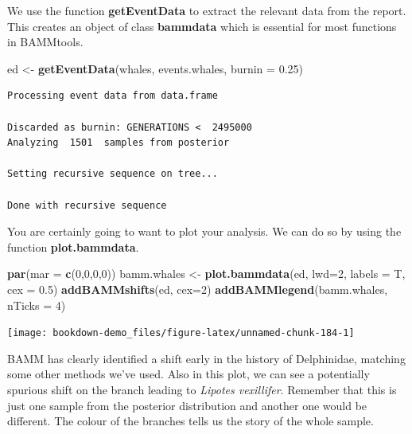 \documentclass[
]{book}
\newenvironment{Shaded}{\begin{snugshade}}{\end{snugshade}}
\newcommand{\DataTypeTok}[1]{\textcolor[rgb]{0.13,0.29,0.53}{#1}}
\newcommand{\DecValTok}[1]{\textcolor[rgb]{0.00,0.00,0.81}{#1}}
\newcommand{\FloatTok}[1]{\textcolor[rgb]{0.00,0.00,0.81}{#1}}
\newcommand{\KeywordTok}[1]{\textcolor[rgb]{0.13,0.29,0.53}{\textbf{#1}}}
\newcommand{\NormalTok}[1]{#1}
\newcommand{\StringTok}[1]{\textcolor[rgb]{0.31,0.60,0.02}{#1}}
\begin{document}
We use the function \textbf{getEventData} to extract the relevant data from the report. This creates an object of class \textbf{bammdata} which is essential for most functions in BAMMtools.

\begin{Shaded}
\begin{Highlighting}[]
\NormalTok{ed \textless{}{-}}\StringTok{ }\KeywordTok{getEventData}\NormalTok{(whales, events.whales, }\DataTypeTok{burnin =} \FloatTok{0.25}\NormalTok{)}
\end{Highlighting}
\end{Shaded}

\begin{verbatim}
Processing event data from data.frame

Discarded as burnin: GENERATIONS <  2495000
Analyzing  1501  samples from posterior

Setting recursive sequence on tree...

Done with recursive sequence
\end{verbatim}

You are certainly going to want to plot your analysis. We can do so by using the function \textbf{plot.bammdata}.

\begin{Shaded}
\begin{Highlighting}[]
\KeywordTok{par}\NormalTok{(}\DataTypeTok{mar =} \KeywordTok{c}\NormalTok{(}\DecValTok{0}\NormalTok{,}\DecValTok{0}\NormalTok{,}\DecValTok{0}\NormalTok{,}\DecValTok{0}\NormalTok{))}
\NormalTok{bamm.whales \textless{}{-}}\StringTok{ }\KeywordTok{plot.bammdata}\NormalTok{(ed, }\DataTypeTok{lwd=}\DecValTok{2}\NormalTok{, }\DataTypeTok{labels =}\NormalTok{ T, }\DataTypeTok{cex =} \FloatTok{0.5}\NormalTok{)}
\KeywordTok{addBAMMshifts}\NormalTok{(ed, }\DataTypeTok{cex=}\DecValTok{2}\NormalTok{)}
\KeywordTok{addBAMMlegend}\NormalTok{(bamm.whales, }\DataTypeTok{nTicks =} \DecValTok{4}\NormalTok{)}
\end{Highlighting}
\end{Shaded}

\begin{center}\texttt{[image: bookdown-demo\_files/figure-latex/unnamed-chunk-184-1]} \end{center}

BAMM has clearly identified a shift early in the history of Delphinidae, matching some other methods we've used. Also in this plot, we can see a potentially spurious shift on the branch leading to \emph{Lipotes vexillifer}. Remember that this is just one sample from the posterior distribution and another one would be different. The colour of the branches tells us the story of the whole sample.
\end{document}
